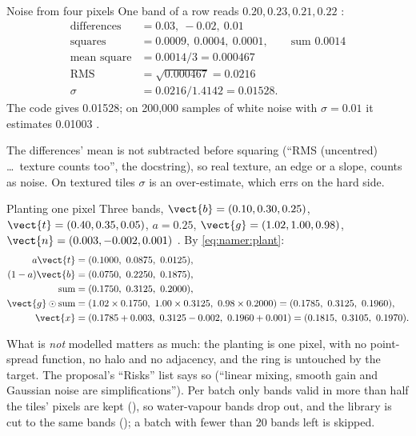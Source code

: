 \begin{worked}[label={we:namer:noise}]{Noise from four pixels}
One band of a row reads $0.20, 0.23, 0.21, 0.22$ \tagA:
\begin{align*}
\text{differences} &= 0.03,\ -0.02,\ 0.01\\
\text{squares} &= 0.0009,\ 0.0004,\ 0.0001, \qquad \text{sum } 0.0014\\
\text{mean square} &= 0.0014/3 = 0.000467\\
\text{RMS} &= \sqrt{0.000467} = 0.0216\\
\sigma &= 0.0216/1.4142 = 0.01528 .
\end{align*}
The code gives 0.01528; on 200,000 samples of white noise with $\sigma=0.01$ it estimates 0.01003 \tagC.
\end{worked}

\begin{sourcenote}
The differences' mean is not subtracted before squaring (``RMS (uncentred) \dots\ texture counts too'', the
docstring), so real texture, an edge or a slope, counts as noise. On textured tiles $\sigma$ is an over-estimate, which
errs on the hard side.
\end{sourcenote}

\begin{worked}[label={we:namer:plant}]{Planting one pixel}
Three bands, $\vect{b}=(0.10,0.30,0.25)$, $\vect{t}=(0.40,0.35,0.05)$, $a=0.25$, $\vect{g}=(1.02,1.00,0.98)$,
$\vect{n}=(0.003,-0.002,0.001)$ \tagA. By \cref{eq:namer:plant}:
\begin{align*}
a\vect{t} &= (0.1000,\ 0.0875,\ 0.0125),\\
(1-a)\vect{b} &= (0.0750,\ 0.2250,\ 0.1875),\\
\text{sum} &= (0.1750,\ 0.3125,\ 0.2000),\\
\vect{g}\odot\text{sum} &= (1.02\times0.1750,\ 1.00\times0.3125,\ 0.98\times0.2000) = (0.1785,\ 0.3125,\ 0.1960),\\
\vect{x} &= (0.1785+0.003,\ 0.3125-0.002,\ 0.1960+0.001) = (0.1815,\ 0.3105,\ 0.1970) .
\end{align*}
\end{worked}

What is \emph{not} modelled matters as much: the planting is one pixel, with no point-spread function, no halo and no
adjacency, and the ring is untouched by the target. The proposal's ``Risks'' list says so (``linear mixing, smooth gain
and Gaussian noise are simplifications''). Per batch only bands valid in more than half the tiles' pixels are kept
(), so water-vapour bands drop out, and the library is cut to the
same bands (); a batch with fewer than 20 bands left is skipped.

